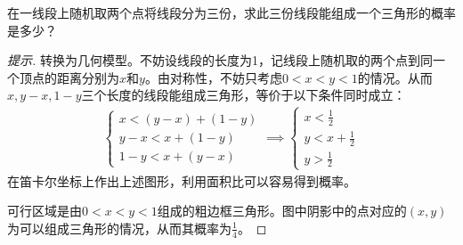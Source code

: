 \begin{example}
  在一线段上随机取两个点将线段分为三份，求此三份线段能组成一个三角形的概率是多少？
\end{example}
\begin{proof}[提示]
  转换为几何模型。不妨设线段的长度为1，记线段上随机取的两个点到同一个顶点的距离分别为$x$和$y$。由对称性，不妨只考虑$0<x<y<1$的情况。从而$x,y-x,1-y$三个长度的线段能组成三角形，等价于以下条件同时成立：
  \begin{align*}
    \begin{cases}
      x < (y-x) + (1-y)\\
      y - x < x + (1 - y)\\
      1 - y < x + (y - x)
    \end{cases}
    \implies
    \begin{cases}
      x<\frac12\\ y<x + \frac12\\ y>\frac12
    \end{cases}
  \end{align*}
  在笛卡尔坐标上作出上述图形，利用面积比可以容易得到概率。
  \begin{center}
  \end{center}
  可行区域是由$0<x<y<1$组成的粗边框三角形。图中阴影中的点对应的$(x,y)$为可以组成三角形的情况，从而其概率为$\frac14$。
\end{proof}

